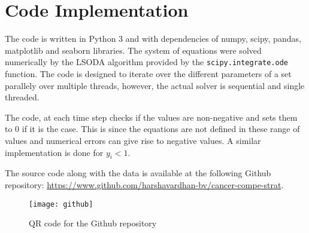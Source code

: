 \section{Code Implementation}
The code is written in Python 3 and with dependencies of numpy, scipy, pandas, matplotlib and seaborn libraries. The system of equations were solved numerically by the LSODA algorithm provided by the \texttt{scipy.integrate.ode} function. The code is designed to iterate over the different parameters of a set parallely over multiple threads, however, the actual solver is sequential and single threaded.

The code, at each time step checks if the values are non-negative and sets them to 0 if it is the case. This is since the equations are not defined in these range of values and numerical errors can give rise to negative values. A similar implementation is done for $y_i < 1$.

The source code along with the data is available at the following Github repository: \url{https://www.github.com/harshavardhan-bv/cancer-compe-strat}.
\begin{figure}[h]
  \centering
  \texttt{[image: github]}
  \caption{QR code for the Github repository}
  \label{github}
\end{figure}


